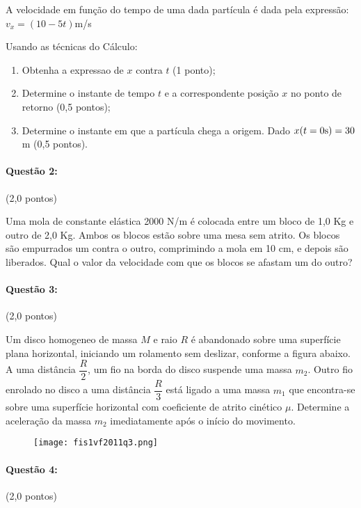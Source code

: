 \documentclass[12pt,a4paper]{article}
\begin{document}
A velocidade em função do tempo de uma dada partícula é dada pela expressão: $v_x=(10-5t)$m/s

Usando as técnicas do Cálculo:

\begin{enumerate}[label=(\alph*)]
\item Obtenha a expressao de $x$ contra $t$ (1 ponto);

\item Determine o instante de tempo $t$ e a correspondente posição $x$ no ponto de retorno (0,5 pontos);


\item Determine o instante em que a partícula chega a origem. Dado $x(t=0\text s)=30$ m (0,5 pontos).
\end{enumerate}

\paragraph{Questão 2:} (2,0 pontos)

Uma mola de constante elástica 2000 N/m é colocada entre um bloco de 1,0 Kg e outro de 2,0 Kg. Ambos os blocos estão sobre uma mesa sem atrito. Os blocos são empurrados um contra o outro, comprimindo a mola em 10 cm, e depois são liberados. Qual o valor da velocidade com que os blocos se afastam um do outro?

\paragraph{Questão 3:} (2,0 pontos)

Um disco homogeneo de massa $M$ e raio $R$ é abandonado sobre uma superfície plana horizontal, iniciando um rolamento sem deslizar, conforme a figura abaixo. A uma distância $\dfrac R 2$, um fio na borda do disco suspende uma massa $m_2$. Outro fio enrolado no disco a uma distância $\dfrac R 3$ está ligado a uma massa $m_1$ que encontra-se sobre uma superfície horizontal com coeficiente de atrito cinético $\mu$. Determine a aceleração da massa $m_2$ imediatamente após o início do movimento.
\begin{figure}[ht]
\centering
\texttt{[image: fis1vf2011q3.png]}
\end{figure}


\paragraph{Questão 4:} (2,0 pontos)
\end{document}
